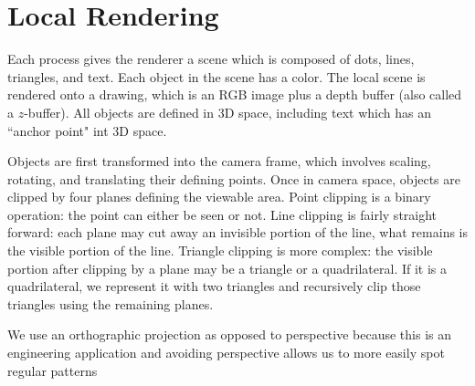 \documentclass{article}
\begin{document}
\section{Local Rendering}
Each process gives the renderer a scene
which is composed of dots, lines, triangles,
and text.
Each object in the scene has a color.
The local scene is rendered onto a drawing,
which is an RGB image plus a depth buffer
(also called a $z$-buffer).
All objects are defined in 3D space, including
text which has an ``anchor point" int 3D space.

Objects are first transformed into the camera
frame, which involves scaling, rotating, and
translating their defining points.
Once in camera space, objects are clipped by
four planes defining the viewable area.
Point clipping is a binary operation: the point
can either be seen or not.
Line clipping is fairly straight forward: each
plane may cut away an invisible portion of the line, what
remains is the visible portion of the line.
Triangle clipping is more complex: the visible
portion after clipping by a plane may be a triangle
or a quadrilateral.
If it is a quadrilateral, we represent it with two
triangles and recursively clip those triangles using
the remaining planes.

We use an orthographic projection as opposed to
perspective because this is an engineering application
and avoiding perspective allows us to more easily spot
regular patterns
\end{document}
